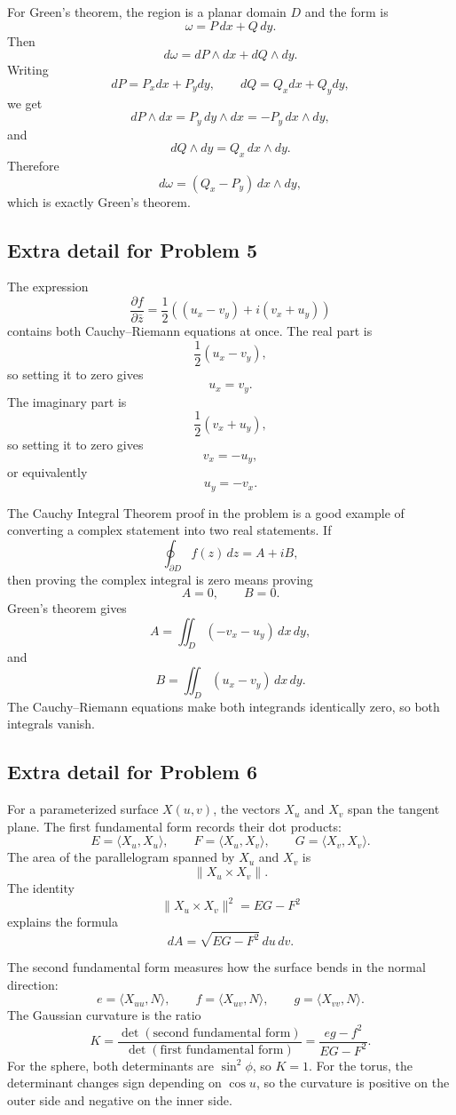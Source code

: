 \documentclass[11pt]{article}
\newcommand{\pd}{\partial}
\begin{document}
For Green's theorem, the region is a planar domain $D$ and the form is
\[
 \omega=P\,dx+Q\,dy.
\]
Then
\[
 d\omega=dP\wedge dx+dQ\wedge dy.
\]
Writing
\[
 dP=P_xdx+P_y dy,\qquad dQ=Q_xdx+Q_y dy,
\]
we get
\[
 dP\wedge dx=P_y\,dy\wedge dx=-P_y\,dx\wedge dy,
\]
and
\[
 dQ\wedge dy=Q_x\,dx\wedge dy.
\]
Therefore
\[
 d\omega=(Q_x-P_y)\,dx\wedge dy,
\]
which is exactly Green's theorem.

\subsection*{Extra detail for Problem 5}

The expression
\[
 \frac{\pd f}{\pd\bar z}
 =
 \frac12\left((u_x-v_y)+i(v_x+u_y)\right)
\]
contains both Cauchy--Riemann equations at once. The real part is
\[
 \frac12(u_x-v_y),
\]
so setting it to zero gives
\[
 u_x=v_y.
\]
The imaginary part is
\[
 \frac12(v_x+u_y),
\]
so setting it to zero gives
\[
 v_x=-u_y,
\]
or equivalently
\[
 u_y=-v_x.
\]

The Cauchy Integral Theorem proof in the problem is a good example of converting a complex statement into two real statements. If
\[
 \oint_{\partial D}f(z)\,dz=A+iB,
\]
then proving the complex integral is zero means proving
\[
 A=0,\qquad B=0.
\]
Green's theorem gives
\[
 A=\iint_D(-v_x-u_y)\,dx\,dy,
\]
and
\[
 B=\iint_D(u_x-v_y)\,dx\,dy.
\]
The Cauchy--Riemann equations make both integrands identically zero, so both integrals vanish.

\subsection*{Extra detail for Problem 6}

For a parameterized surface $X(u,v)$, the vectors $X_u$ and $X_v$ span the tangent plane. The first fundamental form records their dot products:
\[
 E=\langle X_u,X_u\rangle,\qquad
 F=\langle X_u,X_v\rangle,\qquad
 G=\langle X_v,X_v\rangle.
\]
The area of the parallelogram spanned by $X_u$ and $X_v$ is
\[
 \|X_u\times X_v\|.
\]
The identity
\[
 \|X_u\times X_v\|^2=EG-F^2
\]
explains the formula
\[
 dA=\sqrt{EG-F^2}\,du\,dv.
\]

The second fundamental form measures how the surface bends in the normal direction:
\[
 e=\langle X_{uu},N\rangle,\qquad
 f=\langle X_{uv},N\rangle,\qquad
 g=\langle X_{vv},N\rangle.
\]
The Gaussian curvature is the ratio
\[
 K=\frac{\det(\text{second fundamental form})}{\det(\text{first fundamental form})}
 =
 \frac{eg-f^2}{EG-F^2}.
\]
For the sphere, both determinants are $\sin^2\phi$, so $K=1$. For the torus, the determinant changes sign depending on $\cos u$, so the curvature is positive on the outer side and negative on the inner side.
\end{document}

